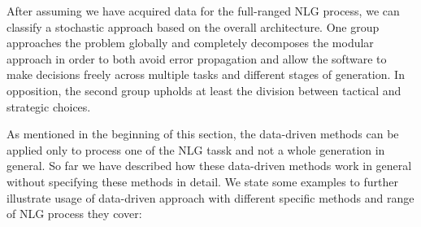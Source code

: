 After assuming we have acquired data for the full-ranged NLG process, we can classify a stochastic approach based on the overall architecture. One group approaches the problem globally and completely decomposes the modular approach in order to both avoid error propagation and allow the software to make decisions freely across multiple tasks and different stages of generation. In opposition, the second group upholds at least the division between tactical and strategic choices.  

As mentioned in the beginning of this section, the data-driven methods can be applied only to process one of the NLG tassk and not a whole generation in general. So far we have described how these data-driven methods work in general without specifying these methods in detail. We state some examples to further illustrate usage of data-driven approach with different specific methods and range of NLG process they cover:

